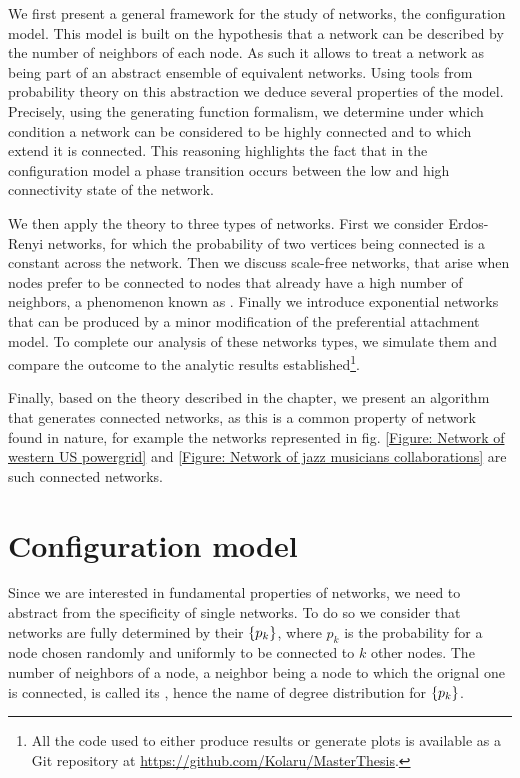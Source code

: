 \documentclass[
11pt, %
american, %
singlespacing, %
final, %
nolistspacing, %
liststotoc, %
headsepline, %
]{MastersDoctoralThesis} %
\begin{document}
We first present a general framework for the study of networks, the configuration model. This model is built on the hypothesis that a network can be described by the number of neighbors of each node. As such it allows to treat a network as being part of an abstract ensemble of equivalent networks. Using tools from probability theory on this abstraction we deduce several properties of the model. Precisely, using the generating function formalism, we determine under which condition a network can be considered to be highly connected and to which extend it is connected. This reasoning highlights the fact that in the configuration model a phase transition occurs between the low and high connectivity state of the network.

We then apply the theory to three types of networks. First we consider Erdos-Renyi networks, for which the probability of two vertices being connected is a constant across the network. Then we discuss scale-free networks, that arise when nodes prefer to be connected to nodes that already have a high number of neighbors, a phenomenon known as . Finally we introduce exponential networks that can be produced by a minor modification of the preferential attachment model. To complete our analysis of these networks types, we simulate them and compare the outcome to the analytic results established\footnote{All the code used to either produce results or generate plots is available as a Git repository at \url{https://github.com/Kolaru/MasterThesis}.}.

Finally, based on the theory described in the chapter, we present an algorithm that generates connected networks, as this is a common property of network found in nature, for example the networks represented in fig. \ref{Figure: Network of western US powergrid} and \ref{Figure: Network of jazz musicians collaborations} are such connected networks.

\section{Configuration model}
\label{Section: Configuration model}

Since we are interested in fundamental properties of networks, we need to abstract from the specificity of single networks. To do so we consider that networks are fully determined by their  $\{p_k\}$, where $p_k$ is the probability for a node chosen randomly and uniformly to be connected to $k$ other nodes. The number of neighbors of a node, a neighbor being a node to which the orignal one is connected, is called its , hence the name of degree distribution for $\{p_k\}$.
\end{document}
